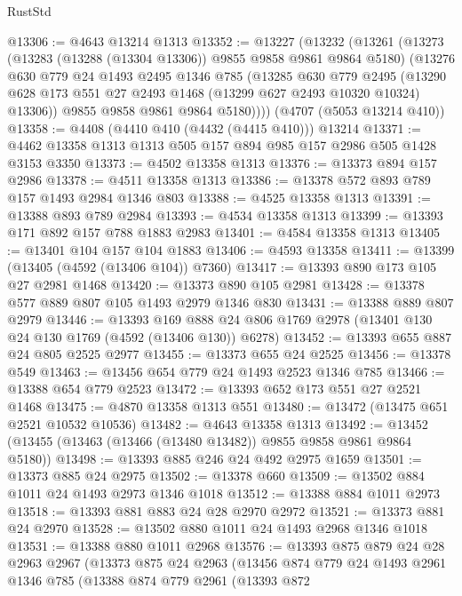 \begin{lexlean}{RustStd}
\begin{coremodule}
@13306 := @4643 @13214 @1313
@13352 := @13227
    (@13232
      (@13261
        (@13273
          (@13283 (@13288 (@13304 @13306)) @9855 @9858 @9861 @9864 @5180)
          (@13276
            @630
            @779
            @24
            @1493
            @2495
            @1346
            @785
            (@13285
              @630
              @779
              @2495
              (@13290 @628 @173 @551 @27 @2493 @1468 (@13299 @627 @2493 @10320 @10324) @13306))
            @9855
            @9858
            @9861
            @9864
            @5180))))
    (@4707 (@5053 @13214 @410))
@13358 := @4408 (@4410 @410 (@4432 (@4415 @410))) @13214
@13371 := @4462 @13358 @1313 @1313 @505 @157 @894 @985 @157 @2986 @505 @1428 @3153 @3350
@13373 := @4502 @13358 @1313
@13376 := @13373 @894 @157 @2986
@13378 := @4511 @13358 @1313
@13386 := @13378 @572 @893 @789 @157 @1493 @2984 @1346 @803
@13388 := @4525 @13358 @1313
@13391 := @13388 @893 @789 @2984
@13393 := @4534 @13358 @1313
@13399 := @13393 @171 @892 @157 @788 @1883 @2983
@13401 := @4584 @13358 @1313
@13405 := @13401 @104 @157 @104 @1883
@13406 := @4593 @13358
@13411 := @13399 (@13405 (@4592 (@13406 @104)) @7360)
@13417 := @13393 @890 @173 @105 @27 @2981 @1468
@13420 := @13373 @890 @105 @2981
@13428 := @13378 @577 @889 @807 @105 @1493 @2979 @1346 @830
@13431 := @13388 @889 @807 @2979
@13446 := @13393
    @169
    @888
    @24
    @806
    @1769
    @2978
    (@13401 @130 @24 @130 @1769 (@4592 (@13406 @130)) @6278)
@13452 := @13393 @655 @887 @24 @805 @2525 @2977
@13455 := @13373 @655 @24 @2525
@13456 := @13378 @549
@13463 := @13456 @654 @779 @24 @1493 @2523 @1346 @785
@13466 := @13388 @654 @779 @2523
@13472 := @13393 @652 @173 @551 @27 @2521 @1468
@13475 := @4870 @13358 @1313 @551
@13480 := @13472 (@13475 @651 @2521 @10532 @10536)
@13482 := @4643 @13358 @1313
@13492 := @13452 (@13455 (@13463 (@13466 (@13480 @13482)) @9855 @9858 @9861 @9864 @5180))
@13498 := @13393 @885 @246 @24 @492 @2975 @1659
@13501 := @13373 @885 @24 @2975
@13502 := @13378 @660
@13509 := @13502 @884 @1011 @24 @1493 @2973 @1346 @1018
@13512 := @13388 @884 @1011 @2973
@13518 := @13393 @881 @883 @24 @28 @2970 @2972
@13521 := @13373 @881 @24 @2970
@13528 := @13502 @880 @1011 @24 @1493 @2968 @1346 @1018
@13531 := @13388 @880 @1011 @2968
@13576 := @13393
    @875
    @879
    @24
    @28
    @2963
    @2967
    (@13373
      @875
      @24
      @2963
      (@13456
        @874
        @779
        @24
        @1493
        @2961
        @1346
        @785
        (@13388
          @874
          @779
          @2961
          (@13393
            @872

\end{coremodule}
\end{lexlean}
